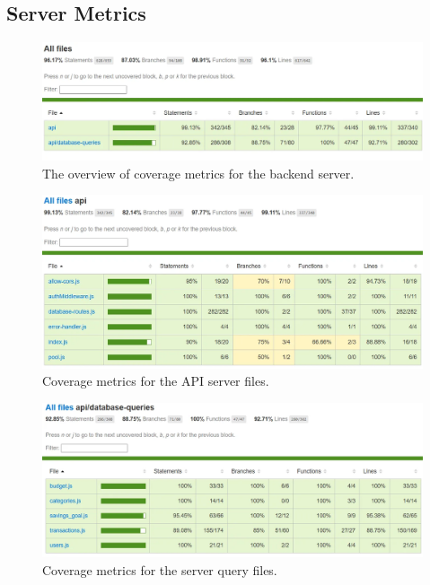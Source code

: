 \documentclass{l4proj}
\begin{document}
\begin{appendices}
\section{Server Metrics}
\label{app:code-coverage-server}
\begin{figure}[H]
    \centering
    \includegraphics[width=\linewidth]{images/Code-Coverage/coverage-server.png}
    \caption{The overview of coverage metrics for the backend server.}
    \label{fig:reports-page}
\end{figure}

\begin{figure}[H]
    \centering
    \includegraphics[width=\linewidth]{images/Code-Coverage/coverage-server-api.png}
    \caption{Coverage metrics for the API server files.}
    \label{fig:reports-page}
\end{figure}

\begin{figure}[H]
    \centering
    \includegraphics[width=\linewidth]{images/Code-Coverage/coverage-server-queries.png}
    \caption{Coverage metrics for the server query files.}
    \label{fig:reports-page}
\end{figure}


\end{appendices}
\end{document}

